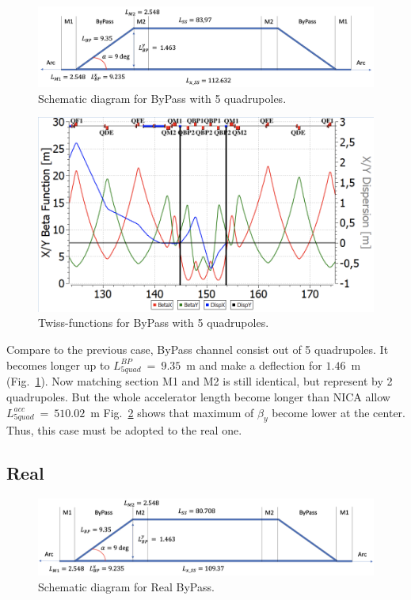 \documentclass[a4paper]{jpconf}
\begin{document}
\begin{figure}[!h]
   \centering
   \includegraphics*[width=1.\columnwidth]{fig4}
   \caption{Schematic diagram for ByPass with 5 quadrupoles.}
   \label{fig:5quad}
\end{figure}

\begin{figure}[!h]
   \centering
   \includegraphics*[width=1.\columnwidth]{fig5}
   \caption{Twiss-functions for ByPass with 5 quadrupoles.}
   \label{fig:5quadTwiss}
\end{figure}

\par Compare to the previous case, ByPass channel consist out of 5 quadrupoles. It becomes longer up to $L^{BP}_{5quad}~=~9.35$~m and make a deflection for $1.46$~m (Fig.~\ref{fig:5quad}). Now matching section M1 and M2 is still identical, but represent by 2 quadrupoles. But the whole accelerator length become longer than NICA allow $L^{acc}_{5quad}~=~510.02$~m Fig.~\ref{fig:5quadTwiss} shows that maximum of $\beta_{y}$ become lower at the center. Thus, this case must be adopted to the real one.

\subsection{Real}

\begin{figure}[!h]
   \centering
   \includegraphics*[width=1.\columnwidth]{fig6}
   \caption{Schematic diagram for Real ByPass.}
   \label{fig:real}
\end{figure}
\end{document}
